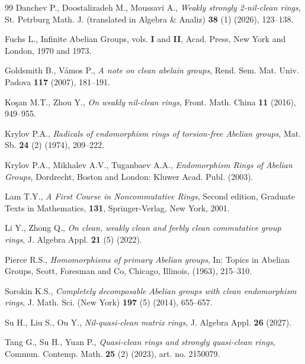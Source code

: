\documentclass{amsart}
\theoremstyle{definition}
\theoremstyle{remark}
\numberwithin{equation}{section}
\begin{document}
\begin{thebibliography}{99}
Danchev P., Doostalizadeh M., Moussavi A., {\it Weakly strongly 2-nil-clean rings}, St. Petrburg Math. J. (translated in Algebra \& Analiz) {\bf 38} (1) (2026), 123--138.

Fuchs L., Infinite Abelian Groups, vols. {\bf I} and {\bf II}, Acad. Press, New York and London, 1970 and 1973.

Goldsmith B., V\'amos P., {\it A note on clean abelain groups}, Rend. Sem. Mat. Univ. Padova {\bf 117} (2007), 181--191.

Ko\c{s}an M.T., Zhou Y., {\it On weakly nil-clean rings}, Front. Math. China {\bf 11} (2016), 949--955.

Krylov P.A., {\it Radicals of endomorphism rings of torsion-free Abelian groups}, Mat. Sb. {\bf 24} (2) (1974), 209--222.

Krylov P.A., Mikhalev A.V., Tuganbaev A.A., {\it Endomorphism Rings of Abelian Groups}, Dordrecht, Boston and London: Kluwer Acad. Publ. (2003).

Lam T.Y., {\it A First Course in Noncommutative Rings}, Second edition, Graduate Texts in Mathematics, {\bf 131},  Springer-Verlag, New York, 2001.

Li Y., Zhong Q., {\it On clean, weakly clean and feebly clean commutative group rings}, J. Algebra Appl. {\bf 21} (5) (2022).

Pierce R.S., {\it Homomorphisms of primary Abelian groups}, In: Topics in Abelian Groups, Scott, Foresman and Co, Chicago, Illinois, (1963), 215--310.

Sorokin K.S., {\it Completely decomposable Abelian groups with clean endomorphism rings}, J. Math. Sci. (New York) {\bf 197} (5) (2014), 655--657.

Su H., Liu S., Ou Y., {\it Nil-quasi-clean matrix rings}, J. Algebra Appl. {\bf 26} (2027).

Tang G., Su H., Yuan P., {\it Quasi-clean rings and strongly quasi-clean rings}, Commun. Contemp. Math. {\bf 25} (2) (2023), art. no. 2150079.


\end{thebibliography}
\end{document}
